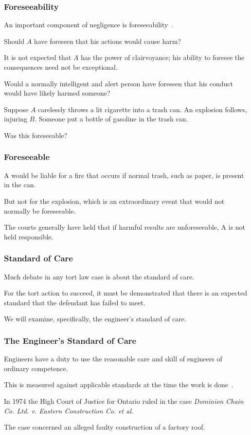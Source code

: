 \begin{frame}
\frametitle{Foreseeability}

An important component of negligence is \alert{foreseeability}~\cite{lba}.

Should $A$ have foreseen that his actions would cause harm?

It is not expected that $A$ has the power of clairvoyance; his ability to foresee the consequences need not be exceptional.

Would a normally intelligent and alert person have foreseen that his conduct would have likely harmed someone?

Suppose $A$ carelessly throws a lit cigarette into a trash can. An explosion follows, injuring $B$. Someone put a bottle of gasoline in the trash can.

Was this foreseeable?

\end{frame}



\begin{frame}
\frametitle{Foreseeable}

A would be liable for a fire that occurs if normal trash, such as paper, is present in the can.

But not for the explosion, which is an extraordinary event that would not normally be foreseeable.

The courts generally have held that if harmful results are unforeseeable, A is not held responsible.

\end{frame}



\begin{frame}
\frametitle{Standard of Care}

Much debate in any tort law case is about the standard of care. 

For the tort action to succeed, it must be demonstrated that there is an expected standard that the defendant has failed to meet.

We will examine, specifically, the engineer's standard of care.

\end{frame}



\begin{frame}
\frametitle{The Engineer's Standard of Care}

Engineers have a duty to use the reasonable care and skill of engineers of ordinary competence.

This is measured against applicable standards at the time the work is done~\cite{lpe}.

In 1974 the High Court of Justice for Ontario ruled in the case \textit{Dominion Chain Co. Ltd. v. Eastern Construction Co. et al}.

The case concerned an alleged faulty construction of a factory roof.

\end{frame}



